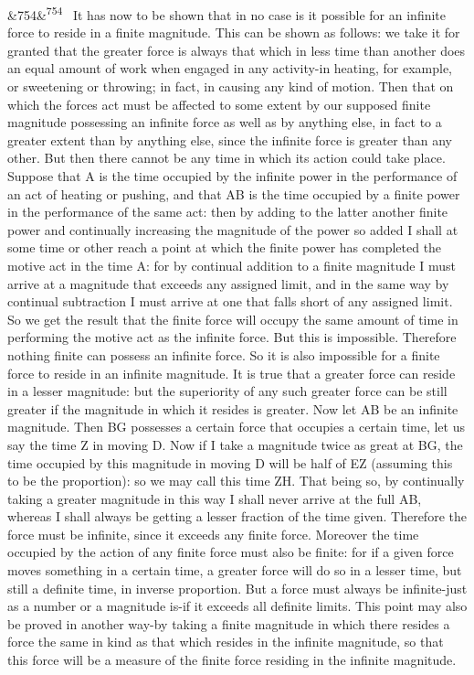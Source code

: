 \documentclass[12pt]{article}
\newcommand{\para}[1][]{\par\noindent\ifx&#1&\else\textsuperscript{\footnotesize #1}~\fi}
\begin{document}
\para[754] It has now to be shown that in no case is it possible for an infinite force to reside in a finite magnitude. This can be shown as follows: we take it for granted that the greater force is always that which in less time than another does an equal amount of work when engaged in any activity-in heating, for example, or sweetening or throwing; in fact, in causing any kind of motion. Then that on which the forces act must be affected to some extent by our supposed finite magnitude possessing an infinite force as well as by anything else, in fact to a greater extent than by anything else, since the infinite force is greater than any other. But then there cannot be any time in which its action could take place. Suppose that A is the time occupied by the infinite power in the performance of an act of heating or pushing, and that AB is the time occupied by a finite power in the performance of the same act: then by adding to the latter another finite power and continually increasing the magnitude of the power so added I shall at some time or other reach a point at which the finite power has completed the motive act in the time A: for by continual addition to a finite magnitude I must arrive at a magnitude that exceeds any assigned limit, and in the same way by continual subtraction I must arrive at one that falls short of any assigned limit. So we get the result that the finite force will occupy the same amount of time in performing the motive act as the infinite force. But this is impossible. Therefore nothing finite can possess an infinite force. So it is also impossible for a finite force to reside in an infinite magnitude. It is true that a greater force can reside in a lesser magnitude: but the superiority of any such greater force can be still greater if the magnitude in which it resides is greater. Now let AB be an infinite magnitude. Then BG possesses a certain force that occupies a certain time, let us say the time Z in moving D. Now if I take a magnitude twice as great at BG, the time occupied by this magnitude in moving D will be half of EZ (assuming this to be the proportion): so we may call this time ZH. That being so, by continually taking a greater magnitude in this way I shall never arrive at the full AB, whereas I shall always be getting a lesser fraction of the time given. Therefore the force must be infinite, since it exceeds any finite force. Moreover the time occupied by the action of any finite force must also be finite: for if a given force moves something in a certain time, a greater force will do so in a lesser time, but still a definite time, in inverse proportion. But a force must always be infinite-just as a number or a magnitude is-if it exceeds all definite limits. This point may also be proved in another way-by taking a finite magnitude in which there resides a force the same in kind as that which resides in the infinite magnitude, so that this force will be a measure of the finite force residing in the infinite magnitude.
\end{document}
